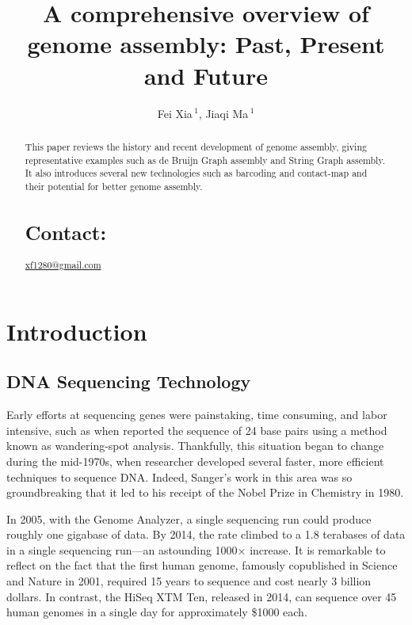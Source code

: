\documentclass{bioinfo}
\begin{document}



\title[short Title]{A comprehensive overview of genome assembly: Past, Present and Future}
\author[Fei Xia, Jiaqi Ma]{Fei Xia\,$^{1}$, Jiaqi Ma\,$^{1}$ }
\address{$^{1}$Department of Automation, Tsinghua University\\}



\maketitle

\begin{abstract}
This paper reviews the history and recent development of genome assembly, giving representative examples such as de Bruijn Graph assembly and String Graph assembly. It also introduces several new technologies such as barcoding and contact-map and their potential for better genome assembly. 

\section{Contact:} \href{xf1280@gmail.com}{xf1280@gmail.com}
\end{abstract}

\section{Introduction}

\subsection{DNA Sequencing Technology}

Early efforts at sequencing genes were painstaking, time consuming, and labor intensive, such as when \cite{maxam1979sequencing} reported the sequence of 24 base pairs using a method known as wandering-spot analysis. Thankfully, this situation began to change during the mid-1970s, when researcher \cite{sanger1977dna} developed several faster, more efficient techniques to sequence DNA. Indeed, Sanger's work in this area was so groundbreaking that it led to his receipt of the Nobel Prize in Chemistry in 1980.

In 2005, with the Genome Analyzer, a single sequencing run could produce roughly one gigabase of data. By 2014, the rate climbed to a 1.8 terabases of data in a single sequencing run—an astounding 1000× increase. It is remarkable to reflect on the fact that the first human genome, famously copublished in Science and Nature in 2001, required 15 years to sequence and cost nearly 3 billion dollars. In contrast, the HiSeq XTM Ten, released in 2014, can sequence over 45 human genomes in a single day for approximately \$1000 each.
\end{document}
